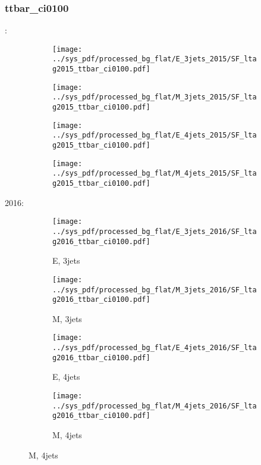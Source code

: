 \documentclass{beamer}
\begin{document}
\begin{frame}
\frametitle{ttbar_ci0100}
\fontsize{5}{1}:
\begin{figure}
\centering
\begin{subfigure}[b]{0.24\textwidth}
\texttt{[image: ../sys\_pdf/processed\_bg\_flat/E\_3jets\_2015/SF\_ltag2015\_ttbar\_ci0100.pdf]}
\end{subfigure}
\begin{subfigure}[b]{0.24\textwidth}
\texttt{[image: ../sys\_pdf/processed\_bg\_flat/M\_3jets\_2015/SF\_ltag2015\_ttbar\_ci0100.pdf]}
\end{subfigure}
\begin{subfigure}[b]{0.24\textwidth}
\texttt{[image: ../sys\_pdf/processed\_bg\_flat/E\_4jets\_2015/SF\_ltag2015\_ttbar\_ci0100.pdf]}
\end{subfigure}
\begin{subfigure}[b]{0.24\textwidth}
\texttt{[image: ../sys\_pdf/processed\_bg\_flat/M\_4jets\_2015/SF\_ltag2015\_ttbar\_ci0100.pdf]}
\end{subfigure}
\end{figure}
2016:
\begin{figure}
\centering
\begin{subfigure}[b]{0.24\textwidth}
\texttt{[image: ../sys\_pdf/processed\_bg\_flat/E\_3jets\_2016/SF\_ltag2016\_ttbar\_ci0100.pdf]}
\captionsetup{font=tiny}
\caption{E, 3jets}
\end{subfigure}
\begin{subfigure}[b]{0.24\textwidth}
\texttt{[image: ../sys\_pdf/processed\_bg\_flat/M\_3jets\_2016/SF\_ltag2016\_ttbar\_ci0100.pdf]}
\captionsetup{font=tiny}
\caption{M, 3jets}
\end{subfigure}
\begin{subfigure}[b]{0.24\textwidth}
\texttt{[image: ../sys\_pdf/processed\_bg\_flat/E\_4jets\_2016/SF\_ltag2016\_ttbar\_ci0100.pdf]}
\captionsetup{font=tiny}
\caption{E, 4jets}
\end{subfigure}
\begin{subfigure}[b]{0.24\textwidth}
\texttt{[image: ../sys\_pdf/processed\_bg\_flat/M\_4jets\_2016/SF\_ltag2016\_ttbar\_ci0100.pdf]}
\captionsetup{font=tiny}
\caption{M, 4jets}
\end{subfigure}
\end{figure}
\end{frame}
\end{document}
